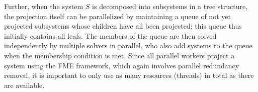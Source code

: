 \documentclass{llncs}
\newcommand{\mi}{\mathit}
\begin{document}
Further, when the system $S$ is decomposed into subsystems in a tree structure, the projection itself can be parallelized by maintaining a queue of not yet projected subsystems whose children have all been projected; this queue thus initially contains all leafs. 
The members of the queue are then solved independently by multiple solvers in parallel, who also add systems to the queue when the membership condition is met.
%
%
Since all parallel workers project a system using the FME framework, which again involves parallel redundancy removal, it is important to only use as many resources (threads) in total as there are available.

\end{document}
